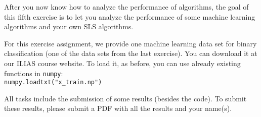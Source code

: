 \documentclass{exam}
\begin{document}
After you now know how to analyze the performance of algorithms,
the goal of this fifth exercise is to let you analyze the performance of some machine learning algorithms
and your own SLS algorithms.

\bigskip

For this exercise assignment, 
we provide one machine learning data set for binary classification (one of the data sets from the last exercise).
You can download it at our ILIAS course website. To load it, as before, you can use already existing functions in \texttt{numpy}:\\
\texttt{numpy.loadtxt("x\_train.np")}

\bigskip

All tasks include the submission of some results (besides the code).
To submit these results, please submit a PDF with all the results and your name(s).
\end{document}
